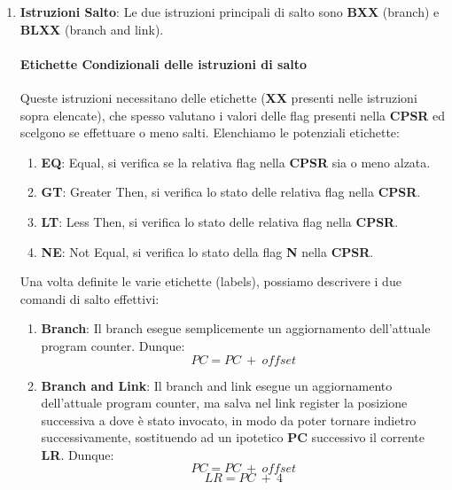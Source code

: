 \documentclass{article}
\begin{document}
\begin{enumerate}
\begin{enumerate}
\begin{enumerate}
\end{enumerate}

\end{enumerate}

\newpage

\item \textbf{Istruzioni Salto}: Le due istruzioni principali di salto sono \textbf{BXX} (branch) e \textbf{BLXX} (branch and link).

\paragraph{Etichette Condizionali delle istruzioni di salto} Queste istruzioni necessitano delle etichette (\textbf{XX} presenti nelle istruzioni sopra elencate), che spesso valutano i valori delle flag presenti nella \textbf{CPSR} ed scelgono se effettuare o meno salti. Elenchiamo le potenziali etichette:

\begin{enumerate}
    \item \textbf{EQ}: Equal, si verifica se la relativa flag nella \textbf{CPSR} sia o meno alzata.
    \item \textbf{GT}: Greater Then, si verifica lo stato delle relativa flag nella \textbf{CPSR}.
    \item \textbf{LT}: Less Then, si verifica lo stato delle relativa flag nella \textbf{CPSR}.
    \item \textbf{NE}: Not Equal, si verifica lo stato della flag \textbf{N} nella \textbf{CPSR}.
\end{enumerate}

Una volta definite le varie etichette (labels), possiamo descrivere i due comandi di salto effettivi:

\begin{enumerate}
    \item \textbf{Branch}: Il branch esegue semplicemente un aggiornamento dell'attuale program counter. Dunque:
    \[ PC = PC \: + \: offset \]
    \item \textbf{Branch and Link}: Il branch and link esegue un aggiornamento dell'attuale program counter, ma salva nel link register la posizione successiva a dove è stato invocato, in modo da poter tornare indietro successivamente, sostituendo ad un ipotetico \textbf{PC} successivo il corrente \textbf{LR}. Dunque:
    \[ PC = PC \: + \: offset \]
    \[ LR = PC \: + \: 4 \]
\end{enumerate}

\end{enumerate}
\end{document}
